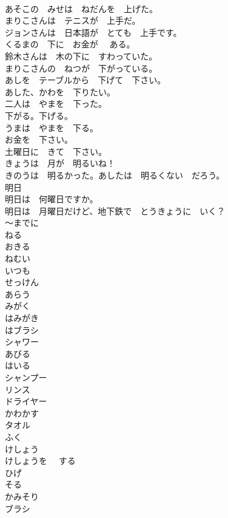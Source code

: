 \documentclass[8pt]{extreport}
\begin{document}
\begin{CJK}{UTF8}{min}
\\	あそこの　みせは　ねだんを　上げた。	
\\	まりこさんは　テニスが　上手だ。	
\\	ジョンさんは　日本語が　とても　上手です。	
\\	くるまの　下に　お金が 　ある。	
\\	鈴木さんは　木の下に　すわっていた。	
\\	まりこさんの　ねつが　下がっている。	
\\	あしを　テーブルから　下げて　下さい。	
\\	あした、かわを　下りたい。	
\\	二人は　やまを　下った。	
\\	下がる。下げる。	
\\	うまは　やまを　下る。	
\\	お金を　下さい。	
\\	土曜日に　きて　下さい。	
\\	きょうは　月が　明るいね！	
\\	きのうは　明るかった。あしたは　明るくない　だろう。	
\\	明日	
\\	明日は　何曜日ですか。	
\\	明日は　月曜日だけど、地下鉄で　とうきょうに　いく？	
\\	～までに	
\\	ねる	
\\	おきる	
\\	ねむい	
\\	いつも	
\\	せっけん	
\\	あらう	
\\	みがく	
\\	はみがき	
\\	はブラシ	
\\	シャワー	
\\	あびる	
\\	はいる	
\\	シャンプー	
\\	リンス	
\\	ドライヤー	
\\	かわかす	
\\	タオル	
\\	ふく	
\\	けしょう	
\\	けしょうを　 する	
\\	ひげ	
\\	そる	
\\	かみそり	
\\	ブラシ	

\end{CJK}
\end{document}
